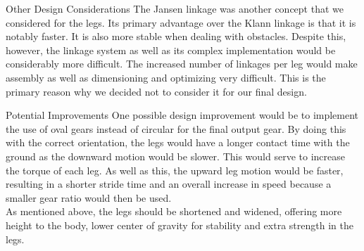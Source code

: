 \begin{homeworkProblem}
\begin{homeworkSection}{Other Design Considerations}
The Jansen linkage was another concept that we considered for the legs. Its primary advantage over the Klann linkage is that it is notably faster. It is also more stable when dealing with obstacles. Despite this, however, the linkage system as well as its complex implementation would be considerably more difficult. The increased number of linkages per leg would make assembly as well as dimensioning and optimizing very difficult. This is the primary reason why we decided not to consider it for our final design.
\end{homeworkSection}

\begin{homeworkSection}{Potential Improvements}
One possible design improvement would be to implement the use of oval gears instead of circular for the final output gear. By doing this with the correct orientation, the legs would have a longer contact time with the ground as the downward motion would be slower. This would serve to increase the torque of each leg. As well as this, the upward leg motion would be faster, resulting in a shorter stride time and an overall increase in speed because a smaller gear ratio would then be used.\\

As mentioned above, the legs should be shortened and widened, offering more height to the body, lower center of gravity for stability and extra strength in the legs.
\end{homeworkSection}
\end{homeworkProblem}

